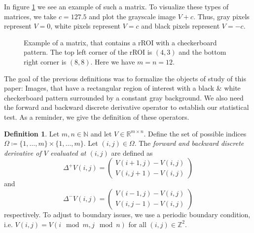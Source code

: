 \documentclass[a4paper,12pt]{article}
\theoremstyle{plain}
\theoremstyle{definition}
\newtheorem{definition}[theorem]{Definition}
\begin{document}
In figure \ref{examplerROItlcbrc} we see an example of such a matrix. To visualize these types of matrices, we take $c = 127.5$ and plot the grayscale image $V + c$. Thus, gray pixels represent $V = 0$, white pixels represent $V = c$ and black pixels represent $V = - c$.

\begin{figure}[h]
	\centering
	\caption{Example of a matrix, that contains a rROI with a checkerboard pattern. The top left corner of the rROI is $(4, 3)$ and the bottom right corner is $(8, 8)$. Here we have $m = n = 12$.}
	\label{examplerROItlcbrc}
\end{figure}

The goal of the previous definitions was to formalize the objects of study of this paper: Images, that have a rectangular region of interest with a black \& white checkerboard pattern surrounded by a constant gray background. We also need the forward and backward discrete derivative operator to establish our statistical test. As a reminder, we give the definition of these operators.

\begin{definition}
	Let $m, n \in \mathbb{N}$ and let $V \in \mathbb{R}^{m \times n}$. Define the set of possible indices $\Omega \coloneqq \{ 1, \dots, m \} \times \{ 1, \dots, m \}$. Let $(i, j) \in \Omega$. The \textit{forward and backward discrete derivative of $V$ evaluated at $(i, j)$} are defined as
	\begin{equation}
		\Delta^+ V(i, j) =
		\begin{pmatrix}
			V(i + 1, j) - V(i, j) \\
			V(i, j + 1) - V(i, j)
		\end{pmatrix}
	\end{equation}
	and
	\begin{equation}
		\Delta^- V(i, j) =
		\begin{pmatrix}
			V(i - 1, j) - V(i, j) \\
			V(i, j - 1) - V(i, j)
		\end{pmatrix}
	\end{equation}
	respectively. To adjust to boundary issues, we use a periodic boundary condition, i.e. $V(i, j) = V(i \mod m, j \mod n)$ for all $(i, j) \in \mathbb{Z}^2$.
\end{definition}
\end{document}
